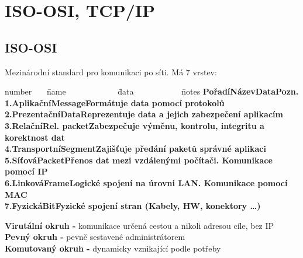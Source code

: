 \section{ISO-OSI, TCP/IP}
  \subsection{ISO-OSI}
    Mezinárodní standard pro komunikaci po síti. Má 7 vrstev:
    \begin{tabbing}
      number ~~~\= name ~~~~~~~~~~~~\= data ~~~~~~~~~~~\= notes \kill
      \bfseries Pořadí\>\bfseries Název\>\bfseries Data\>\bfseries Pozn.\\[2mm]
      1.\>Aplikační\>Message\>Formátuje data pomocí protokolů\\
      2.\>Prezentační\>Data\>Reprezentuje data a jejich zabezpečení aplikacím\\
      3.\>Relační\>Rel. packet\>Zabezpečuje výměnu, kontrolu, integritu a korektnost dat\\
      4.\>Transportní\>Segment\>Zajišťuje předání paketů správné aplikaci\\
      5.\>Síťová\>Packet\>Přenos dat mezi vzdálenými počítači. Komunikace pomocí IP\\
      6.\>Linková\>Frame\>Logické spojení na úrovni LAN. Komunikace pomocí MAC\\
      7.\>Fyzická\>Bit\>Fyzické spojení stran (Kabely, HW, konektory \dots)
    \end{tabbing}
    \textbf{Virutální okruh -} komunikace určená cestou a nikoli adresou cíle, bez IP \\
    \textbf{Pevný okruh -} pevně sestavené administrátorem \\
    \textbf{Komutovaný okruh -} dynamicky vznikající podle potřeby

